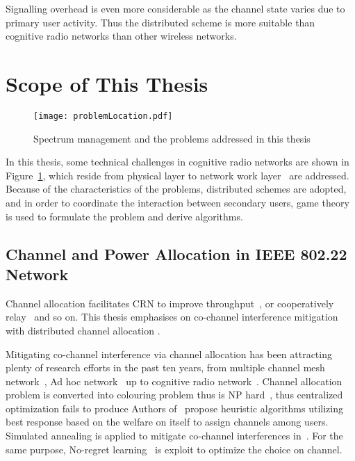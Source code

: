 Signalling overhead is even more considerable as the channel state varies due to primary user activity.
Thus the distributed scheme is more suitable than cognitive radio networks than other wireless networks.



\section{Scope of This Thesis}

\begin{figure}[h!]
  \centering
  \texttt{[image: problemLocation.pdf]}
  \caption{Spectrum management and the problems addressed in this thesis}
\label{problemLocation}
\end{figure}

In this thesis, some technical challenges in cognitive radio networks are shown in Figure~\ref{problemLocation}, which reside from physical layer to network work layer~\cite{osi} are addressed. 
Because of the characteristics of the problems, distributed schemes are adopted, and in order to coordinate the interaction between secondary users, game theory is used to formulate the problem and derive algorithms.

\subsection{Channel and Power Allocation in IEEE 802.22 Network}

Channel allocation facilitates CRN to improve throughput~\cite{channelAllocation_throughput_12wcnc}, or cooperatively relay~\cite{channelAllocation_relay_2010ICASSP} and so on.
This thesis emphasises on co-channel interference mitigation with distributed channel allocation . 

Mitigating co-channel interference via channel allocation has been attracting plenty of research efforts in the past ten years, from multiple channel mesh network~\cite{Hyacinth}, Ad hoc network~\cite{Babadi08, Ko_DistributedCA} up to cognitive radio network~\cite{SA_CA_TVWS_2012crowncom,qlearning_huang}. 
Channel allocation problem is converted into colouring problem thus is NP hard~\cite{Hyacinth}, thus centralized optimization fails to produce
Authors of~\cite{Babadi08, Ko_DistributedCA} propose heuristic algorithms utilizing best response based on the welfare on itself to assign channels among users.
Simulated annealing is applied to mitigate co-channel interferences in~\cite{SA_CA_TVWS_2012crowncom}.
For the same purpose, No-regret learning~\cite{qlearning_huang, hart00correlatedeq} is exploit to optimize the choice on channel.

